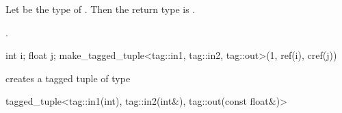 \begin{itemdescr}
\pnum
Let  be the type of .
Then the return type is .

\pnum
\returns {}.

\pnum
\enterexample

\begin{codeblock}
int i; float j;
make_tagged_tuple<tag::in1, tag::in2, tag::out>(1, ref(i), cref(j))
\end{codeblock}

creates a tagged tuple of type

\begin{codeblock}
tagged_tuple<tag::in1(int), tag::in2(int&), tag::out(const float&)>
\end{codeblock}
\exitexample
\end{itemdescr}
